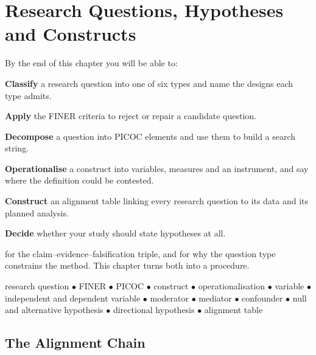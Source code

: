 \chapter{Research Questions, Hypotheses and Constructs}\label{ch:questions}

\begin{outcomes}
By the end of this chapter you will be able to:
\begin{tight}
  \item \textbf{Classify} a research question into one of six types and name
    the designs each type admits.
  \item \textbf{Apply} the FINER criteria to reject or repair a candidate
    question.
  \item \textbf{Decompose} a question into PICOC elements and use them to build
    a search string.
  \item \textbf{Operationalise} a construct into variables, measures and an
    instrument, and say where the definition could be contested.
  \item \textbf{Construct} an alignment table linking every research question
    to its data and its planned analysis.
  \item \textbf{Decide} whether your study should state hypotheses at all.
\end{tight}
\end{outcomes}

\begin{prereq}
 for the claim--evidence--falsification triple, and
 for why the question type constrains the method. This
chapter turns both into a procedure.
\end{prereq}

\begin{keyterms}
research question $\bullet$ FINER $\bullet$ PICOC $\bullet$ construct $\bullet$
operationalisation $\bullet$ variable $\bullet$ independent and dependent
variable $\bullet$ moderator $\bullet$ mediator $\bullet$ confounder $\bullet$
null and alternative hypothesis $\bullet$ directional hypothesis $\bullet$
alignment table
\end{keyterms}

\section{The Alignment Chain}


